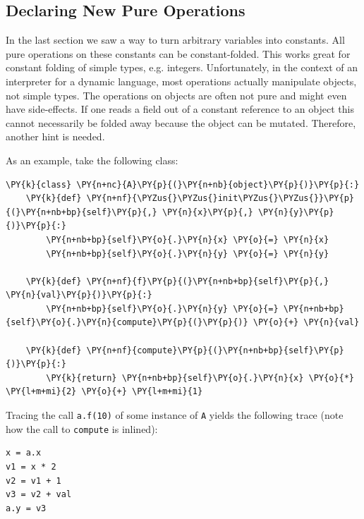 \documentclass{sig-alternate}
\begin{document}
\subsection{Declaring New Pure Operations}

In the last section we saw a way to turn arbitrary variables into constants. All
pure operations on these constants can be constant-folded. This works great for
constant folding of simple types, e.g. integers. Unfortunately, in the context of an
interpreter for a dynamic
language, most operations actually manipulate objects, not simple types. The
operations on objects are often not pure and might even have side-effects. If
one reads a field out of a constant reference to an object this cannot
necessarily be folded away because the object can be mutated. Therefore, another
hint is needed.

As an example, take the following class:

\begin{Verbatim}[commandchars=\\\{\}]
\PY{k}{class} \PY{n+nc}{A}\PY{p}{(}\PY{n+nb}{object}\PY{p}{)}\PY{p}{:}
    \PY{k}{def} \PY{n+nf}{\PYZus{}\PYZus{}init\PYZus{}\PYZus{}}\PY{p}{(}\PY{n+nb+bp}{self}\PY{p}{,} \PY{n}{x}\PY{p}{,} \PY{n}{y}\PY{p}{)}\PY{p}{:}
        \PY{n+nb+bp}{self}\PY{o}{.}\PY{n}{x} \PY{o}{=} \PY{n}{x}
        \PY{n+nb+bp}{self}\PY{o}{.}\PY{n}{y} \PY{o}{=} \PY{n}{y}

    \PY{k}{def} \PY{n+nf}{f}\PY{p}{(}\PY{n+nb+bp}{self}\PY{p}{,} \PY{n}{val}\PY{p}{)}\PY{p}{:}
        \PY{n+nb+bp}{self}\PY{o}{.}\PY{n}{y} \PY{o}{=} \PY{n+nb+bp}{self}\PY{o}{.}\PY{n}{compute}\PY{p}{(}\PY{p}{)} \PY{o}{+} \PY{n}{val}

    \PY{k}{def} \PY{n+nf}{compute}\PY{p}{(}\PY{n+nb+bp}{self}\PY{p}{)}\PY{p}{:}
        \PY{k}{return} \PY{n+nb+bp}{self}\PY{o}{.}\PY{n}{x} \PY{o}{*} \PY{l+m+mi}{2} \PY{o}{+} \PY{l+m+mi}{1}
\end{Verbatim}

Tracing the call \texttt{a.f(10)} of some instance of \texttt{A} yields the following
trace (note how the call to \texttt{compute} is inlined):
%
\begin{Verbatim}
x = a.x
v1 = x * 2
v2 = v1 + 1
v3 = v2 + val
a.y = v3
\end{Verbatim}
\end{document}
